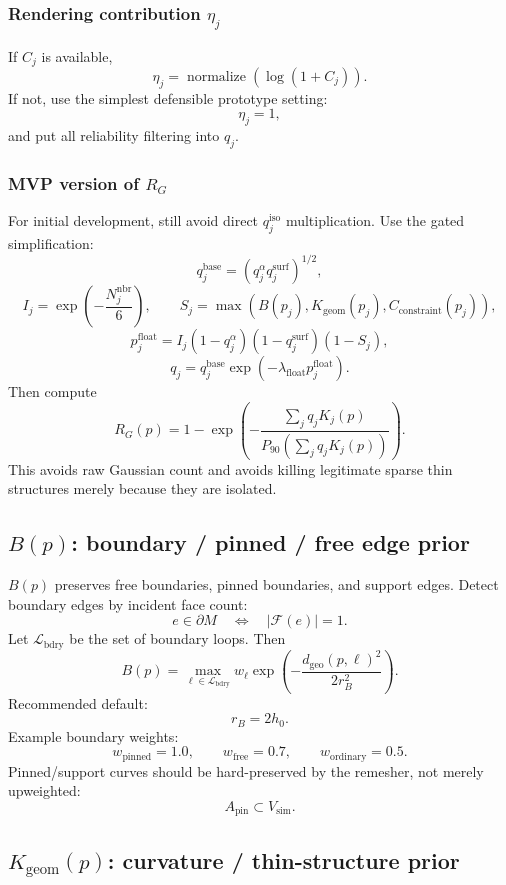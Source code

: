 \documentclass[11pt,a4paper]{article}
\newcommand{\normalize}{\operatorname{normalize}}
\begin{document}
\subsubsection{Rendering contribution $\eta_j$}

If $C_j$ is available,
\[
\eta_j=\normalize(\log(1+C_j)).
\]
If not, use the simplest defensible prototype setting:
\[
\eta_j=1,
\]
and put all reliability filtering into $q_j$.

\subsubsection{MVP version of $R_G$}

For initial development, still avoid direct $q_j^{\mathrm{iso}}$ multiplication. Use the gated simplification:
\[
q_j^{\mathrm{base}}=\left(q_j^\alpha q_j^{\mathrm{surf}}\right)^{1/2},
\]
\[
I_j=\exp\left(-\frac{N_j^{\mathrm{nbr}}}{6}\right),
\qquad
S_j=\max(B(p_j),K_{\mathrm{geom}}(p_j),C_{\mathrm{constraint}}(p_j)),
\]
\[
p_j^{\mathrm{float}}=I_j(1-q_j^\alpha)(1-q_j^{\mathrm{surf}})(1-S_j),
\]
\[
q_j=q_j^{\mathrm{base}}\exp(-\lambda_{\mathrm{float}}p_j^{\mathrm{float}}).
\]
Then compute
\[
R_G(p)=1-\exp\left(-\frac{\sum_j q_jK_j(p)}{P_{90}(\sum_j q_jK_j(p))}\right).
\]
This avoids raw Gaussian count and avoids killing legitimate sparse thin structures merely because they are isolated.

\subsection{$B(p)$: boundary / pinned / free edge prior}

$B(p)$ preserves free boundaries, pinned boundaries, and support edges. Detect boundary edges by incident face count:
\[
e\in\partial M \quad\Longleftrightarrow\quad |\mathcal{F}(e)|=1.
\]
Let $\mathcal{L}_{\mathrm{bdry}}$ be the set of boundary loops. Then
\[
B(p)=\max_{\ell\in\mathcal{L}_{\mathrm{bdry}}}
 w_\ell \exp\left(-\frac{d_{\mathrm{geo}}(p,\ell)^2}{2r_B^2}\right).
\]
Recommended default:
\[
r_B=2h_0.
\]
Example boundary weights:
\[
w_{\mathrm{pinned}}=1.0,
\qquad
w_{\mathrm{free}}=0.7,
\qquad
w_{\mathrm{ordinary}}=0.5.
\]
Pinned/support curves should be hard-preserved by the remesher, not merely upweighted:
\[
A_{\mathrm{pin}}\subset V_{\mathrm{sim}}.
\]

\subsection{$K_{\mathrm{geom}}(p)$: curvature / thin-structure prior}
\end{document}
